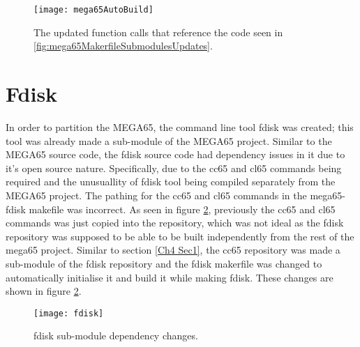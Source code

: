 \begin{figure}
  \centering
  \texttt{[image: mega65AutoBuild]}
  \caption{The updated function calls that reference the code seen in \ref{fig:mega65MakerfileSubmodulesUpdates}.}
  \label{fig:mega65AutoBuild}
\end{figure}


\section{Fdisk}

\label{Ch4 Sec2}

In order to partition the MEGA65, the command line tool fdisk was created; this tool was already made a sub-module of the MEGA65 project. Similar to the MEGA65 source code, the fdisk source code had dependency issues in it due to it's open source nature. Specifically, due to the cc65 and cl65 commands being required and the unusuallity of fdisk tool being compiled separately from the MEGA65 project. The pathing for the cc65 and cl65 commands in the mega65-fdisk makefile was incorrect. As seen in figure \ref{fig:fdisk}, previously the cc65 and cl65 commands was just copied into the repository, which was not ideal as the fdisk repository was supposed to be able to be built independently from the rest of the mega65 project. Similar to section \ref{Ch4 Sec1}, the cc65 repository was made a sub-module of the fdisk repository and the fdisk makerfile was changed to automatically initialise it and build it while making fdisk. These changes are shown in figure \ref{fig:fdisk}.\\

\begin{figure}
  \centering
  \texttt{[image: fdisk]}
  \caption{fdisk sub-module dependency changes.}
  \label{fig:fdisk}
\end{figure}

